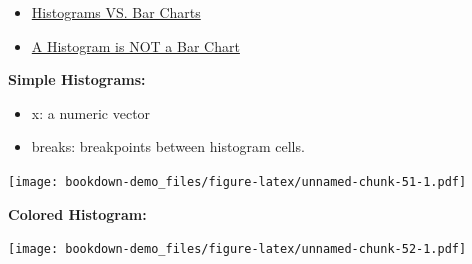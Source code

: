 \documentclass[]{book}
\newenvironment{Shaded}{\begin{snugshade}}{\end{snugshade}}
\newcommand{\KeywordTok}[1]{\textcolor[rgb]{0.13,0.29,0.53}{\textbf{#1}}}
\newcommand{\DataTypeTok}[1]{\textcolor[rgb]{0.13,0.29,0.53}{#1}}
\newcommand{\DecValTok}[1]{\textcolor[rgb]{0.00,0.00,0.81}{#1}}
\newcommand{\FloatTok}[1]{\textcolor[rgb]{0.00,0.00,0.81}{#1}}
\newcommand{\StringTok}[1]{\textcolor[rgb]{0.31,0.60,0.02}{#1}}
\newcommand{\CommentTok}[1]{\textcolor[rgb]{0.56,0.35,0.01}{\textit{#1}}}
\newcommand{\OperatorTok}[1]{\textcolor[rgb]{0.81,0.36,0.00}{\textbf{#1}}}
\newcommand{\NormalTok}[1]{#1}
\begin{document}
\begin{itemize}
\item
  \href{https://www.edrawsoft.com/histogram-vs-bar-chart.php}{Histograms
  VS. Bar Charts}
\item
  \href{https://www.forbes.com/sites/naomirobbins/2012/01/04/a-histogram-is-not-a-bar-chart/\#9849a526d775}{A
  Histogram is NOT a Bar Chart}
\end{itemize}

\textbf{Simple Histograms:}

\begin{itemize}
\item
  x: a numeric vector
\item
  breaks: breakpoints between histogram cells.
\end{itemize}

\begin{Shaded}
\end{Shaded}

\texttt{[image: bookdown-demo\_files/figure-latex/unnamed-chunk-51-1.pdf]}

\textbf{Colored Histogram:}

\begin{Shaded}
\end{Shaded}

\texttt{[image: bookdown-demo\_files/figure-latex/unnamed-chunk-52-1.pdf]}
\end{document}
